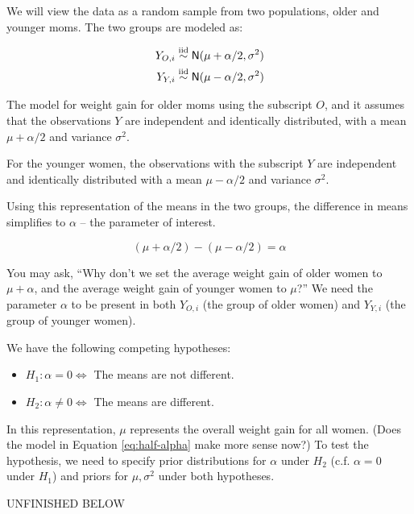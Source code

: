 \documentclass[]{book}
\providecommand{\tightlist}{%
  \setlength{\itemsep}{0pt}\setlength{\parskip}{0pt}}
\theoremstyle{definition}
\theoremstyle{definition}
\theoremstyle{definition}
\theoremstyle{remark}
\begin{document}
We will view the data as a random sample from two populations, older and
younger moms. The two groups are modeled as:

\begin{equation}
\begin{split}
Y_{O,i} &\mathrel{\mathop{\sim}\limits^{\rm iid}} \textsf{N}(\mu + \alpha/2, \sigma^2) \\
Y_{Y,i} &\mathrel{\mathop{\sim}\limits^{\rm iid}} \textsf{N}(\mu - \alpha/2, \sigma^2)
\end{split}
\label{eq:half-alpha}
\end{equation}

The model for weight gain for older moms using the subscript \(O\), and
it assumes that the observations \(Y\) are independent and identically
distributed, with a mean \(\mu+\alpha/2\) and variance \(\sigma^2\).

For the younger women, the observations with the subscript \(Y\) are
independent and identically distributed with a mean \(\mu-\alpha/2\) and
variance \(\sigma^2\).

Using this representation of the means in the two groups, the difference
in means simplifies to \(\alpha\) -- the parameter of interest.

\[(\mu + \alpha/2)  - (\mu - \alpha/2) =  \alpha\]

You may ask, ``Why don't we set the average weight gain of older women
to \(\mu+\alpha\), and the average weight gain of younger women to
\(\mu\)?'' We need the parameter \(\alpha\) to be present in both
\(Y_{O,i}\) (the group of older women) and \(Y_{Y,i}\) (the group of
younger women).

We have the following competing hypotheses:

\begin{itemize}
\tightlist
\item
  \(H_1: \alpha = 0 \Leftrightarrow\) The means are not different.
\item
  \(H_2: \alpha \neq 0 \Leftrightarrow\) The means are different.
\end{itemize}

In this representation, \(\mu\) represents the overall weight gain for
all women. (Does the model in Equation \eqref{eq:half-alpha} make more
sense now?) To test the hypothesis, we need to specify prior
distributions for \(\alpha\) under \(H_2\) (c.f. \(\alpha = 0\) under
\(H_1\)) and priors for \(\mu,\sigma^2\) under both hypotheses.

UNFINISHED BELOW
\end{document}
